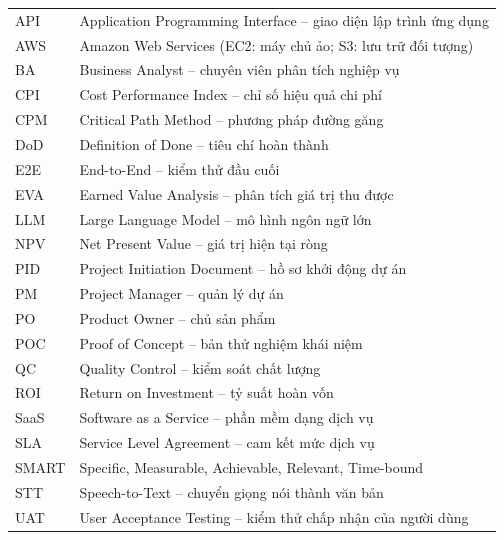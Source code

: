 \documentclass[12pt,a4paper]{report}
\begin{document}
\begin{center}
  \begin{tabular}{@{}P{2.4cm}P{11cm}@{}}
    \toprule
     &  \\
    \midrule
    API   & Application Programming Interface -- giao diện lập trình ứng dụng \\
    AWS   & Amazon Web Services (EC2: máy chủ ảo; S3: lưu trữ đối tượng) \\
    BA    & Business Analyst -- chuyên viên phân tích nghiệp vụ \\
    CPI   & Cost Performance Index -- chỉ số hiệu quả chi phí \\
    CPM   & Critical Path Method -- phương pháp đường găng \\
    DoD   & Definition of Done -- tiêu chí hoàn thành \\
    E2E   & End-to-End -- kiểm thử đầu cuối \\
    EVA   & Earned Value Analysis -- phân tích giá trị thu được \\
    LLM   & Large Language Model -- mô hình ngôn ngữ lớn \\
    NPV   & Net Present Value -- giá trị hiện tại ròng \\
    PID   & Project Initiation Document -- hồ sơ khởi động dự án \\
    PM    & Project Manager -- quản lý dự án \\
    PO    & Product Owner -- chủ sản phẩm \\
    POC   & Proof of Concept -- bản thử nghiệm khái niệm \\
    QC    & Quality Control -- kiểm soát chất lượng \\
    ROI   & Return on Investment -- tỷ suất hoàn vốn \\
    SaaS  & Software as a Service -- phần mềm dạng dịch vụ \\
    SLA   & Service Level Agreement -- cam kết mức dịch vụ \\
    SMART & Specific, Measurable, Achievable, Relevant, Time-bound \\
    STT   & Speech-to-Text -- chuyển giọng nói thành văn bản \\
    UAT   & User Acceptance Testing -- kiểm thử chấp nhận của người dùng \\
    \bottomrule
  \end{tabular}
\end{center}

\cleardoublepage{}
{}
\listoffigures
\end{document}
